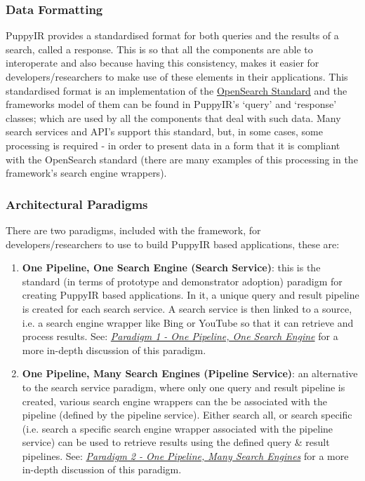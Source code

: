 \documentclass[letterpaper,10pt,english]{sphinxmanual}
\begin{document}
\subsubsection{Data Formatting}
\label{overview:data-formatting}
PuppyIR provides a standardised format for both queries and the results of a search, called a response. This is so that all the components are able to interoperate and also because having this consistency, makes it easier for developers/researchers to make use of these elements in their applications. This standardised format is an implementation of the \href{http://www.opensearch.org/Specifications/OpenSearch/1.1}{OpenSearch Standard} and the frameworks model of them can be found in PuppyIR's `query' and `response' classes; which are used by all the components that deal with such data. Many search services and API's support this standard, but, in some cases, some processing is required - in order to present data in a form that it is compliant with the OpenSearch standard (there are many examples of this processing in the framework's search engine wrappers).


\subsubsection{Architectural Paradigms}
\label{overview:architectural-paradigms}
There are two paradigms, included with the framework, for developers/researchers to use to build PuppyIR based applications, these are:
\begin{enumerate}
\item {} 
\textbf{One Pipeline, One Search Engine (Search Service)}: this is the standard (in terms of prototype and demonstrator adoption) paradigm for creating PuppyIR based applications. In it, a unique query and result pipeline is created for each search service. A search service is then linked to a source, i.e. a search engine wrapper like Bing or YouTube so that it can retrieve and process results. See: {\hyperref[service:service-architecture]{\emph{Paradigm 1 - One Pipeline, One Search Engine}}} for a more in-depth discussion of this paradigm.

\item {} 
\textbf{One Pipeline, Many Search Engines (Pipeline Service)}: an alternative to the search service paradigm, where only one query and result pipeline is created, various search engine wrappers can the be associated with the pipeline (defined by the pipeline service). Either search all, or search specific (i.e. search a specific search engine wrapper associated with the pipeline service) can be used to retrieve results using the defined query \& result pipelines. See: {\hyperref[pipeline:pipeline-architecture]{\emph{Paradigm 2 - One Pipeline, Many Search Engines}}} for a more in-depth discussion of this paradigm.

\end{enumerate}
\end{document}
